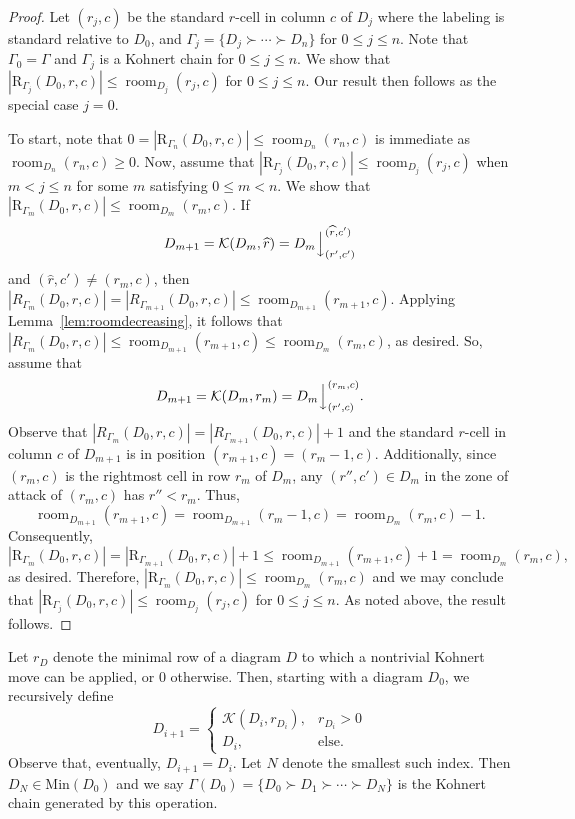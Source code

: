 \documentclass[letterpaper,10pt]{article}
\newcommand{\ldownarrow}{\Big\downarrow}
\DeclareMathOperator{\room}{room}
\begin{document}
\begin{proof}
    Let $(r_j,c)$ be the standard $r$-cell in column $c$ of $D_j$ where the labeling is standard relative to $D_0$, and $\Gamma_j=\{D_j\succ\cdots\succ D_n\}$ for $0\le j\le n$. Note that $\Gamma_0=\Gamma$ and $\Gamma_j$ is a Kohnert chain for $0\le j\le n$. We show that $|\mathrm{R}_{\Gamma_j}(D_0,r, c)| \leq \room_{D_j}(r_j, c)$ for $0\le j\le n$. Our result then follows as the special case $j=0$.

    To start, note that $0=|\mathrm{R}_{\Gamma_n}(D_0,r, c)| \leq \room_{D_n}(r_n, c)$ is immediate as $\room_{D_n}(r_n, c)\ge 0$. Now, assume that $|\mathrm{R}_{\Gamma_j}(D_0,r, c)| \leq \room_{D_j}(r_j, c)$ when $m<j\le n$ for some $m$ satisfying $0\le m<n$. We show that $|\mathrm{R}_{\Gamma_m}(D_0,r, c)| \leq \room_{D_m}(r_m, c)$. If $$D_{m+1}=\mathcal{K}(D_m,\widehat{r})=D_{m}\ldownarrow^{(\widehat{r},c')}_{(r',c')}$$ and $(\widehat{r},c')\neq (r_{m},c)$, then $|R_{\Gamma_{m}}(D_0,r,c)|=|R_{\Gamma_{m+1}}(D_0,r,c)|\le \room_{D_{m+1}}(r_{m+1}, c)$. Applying Lemma~\ref{lem:roomdecreasing}, it follows that $|R_{\Gamma_{m}}(D_0,r,c)|\le \room_{D_{m+1}}(r_{m+1}, c)\le \room_{D_{m}}(r_{m}, c)$, as desired. So, assume that $$D_{m+1}=\mathcal{K}(D_m,r_m)=D_{m}\ldownarrow^{(r_m,c)}_{(r',c)}.$$ Observe that $|R_{\Gamma_{m}}(D_0,r,c)|=|R_{\Gamma_{m+1}}(D_0,r,c)|+1$ and the standard $r$-cell in column $c$ of $D_{m+1}$ is in position $(r_{m+1},c)=(r_m - 1, c)$. Additionally, since $(r_m,c)$ is the rightmost cell in row $r_m$ of $D_m$, any $(r'', c') \in D_m$ in the zone of attack of $(r_m,c)$ has $r'' < r_m$. Thus, 
    \[\room_{D_{m+1}}(r_{m+1}, c)=\room_{D_{m+1}}(r_m - 1, c) = \room_{D_m}(r_m, c) - 1.\] Consequently, \[|\mathrm{R}_{\Gamma_m}(D_0,r, c)| = |\mathrm{R}_{\Gamma_{m+1}}(D_0,r, c)| + 1 \leq \room_{D_{m+1}}(r_{m+1},c) + 1 = \room_{D_m}(r_m, c),\]
    as desired. Therefore, $|\mathrm{R}_{\Gamma_m}(D_0,r, c)| \leq \room_{D_m}(r_m, c)$ and we may conclude that $|\mathrm{R}_{\Gamma_j}(D_0,r, c)| \leq \room_{D_j}(r_j, c)$ for $0\le j\le n$. As noted above, the result follows.
\end{proof}


Let $r_D$ denote the minimal row of a diagram $D$ to which a nontrivial Kohnert move can be applied, or 0 otherwise. Then, starting with a diagram $D_0$, we recursively define
\[D_{i+1} = \begin{cases}
    \mathcal{K}(D_i, r_{D_i}), & r_{D_i} > 0\\
    D_i, & \text{else.}
\end{cases}\]
Observe that, eventually, $D_{i+1} = D_i$. Let $N$ denote the smallest such index. Then $D_N \in \mathrm{Min}(D_0)$ and we say $\Gamma(D_0) = \{D_0 \succ D_1 \succ \cdots \succ D_N\}$ is the Kohnert chain generated by this operation.
\end{document}
